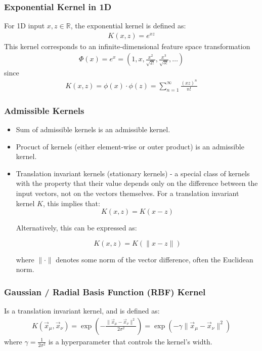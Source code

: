 \documentclass[11pt]{book} %
\begin{document}
\subsubsection{Exponential Kernel in 1D}
For 1D input $x, z \in \mathbb{R}$, the exponential kernel is defined as:
\begin{align*}
    K(x, z) = e^{xz}
\end{align*}
This kernel corresponds to an infinite-dimensional feature space transformation
\begin{align*}
    \Phi(x) = e^x = (1, x, \frac{x^2}{\sqrt{2!}}, \frac{x^3}{\sqrt{3!}}, \ldots)
\end{align*}
since
\begin{align*}
    K(x,z) = \phi(x) \cdot \phi(z) = \sum_{n=1}^{\infty} \frac{(xz)^n}{n!}
\end{align*}

\subsubsection{Admissible Kernels}
\begin {itemize}
    \item Sum of admissible kernels is an admissible kernel.
    \item Procuct of kernels (either element-wise or outer product) is an admissible kernel.
    \item Translation invariant kernels (stationary kernels) - a special class of kernels with the property that their 
    value depends only on the difference between the input vectors, not on the vectors themselves. For a translation invariant kernel \( K \), this implies that:
    \begin{equation}
        K(x, z) = K(x - z)
    \end{equation}
    
    Alternatively, this can be expressed as:
    
    \begin{equation}
        K(x, z) = K(\|x - z\|)
    \end{equation}
    
    where \( \| \cdot \| \) denotes some norm of the vector difference, often the Euclidean norm.
\end{itemize}

\subsubsection{Gaussian / Radial Basis Function (RBF) Kernel}
Is a translation invariant kernel, and is defined as:
\begin{align*}
    K(\vec{x}_\mu, \vec{x}_\nu) = \exp\left(-\frac{\|\vec{x}_\mu - \vec{x}_\nu\|^2}{2\sigma^2}\right) = \exp\left(-\gamma \|\vec{x}_\mu - \vec{x}_\nu\|^2\right)
\end{align*}
where \( \gamma = \frac{1}{2\sigma^2} \) is a hyperparameter that controls the kernel's width.
\end{document}
